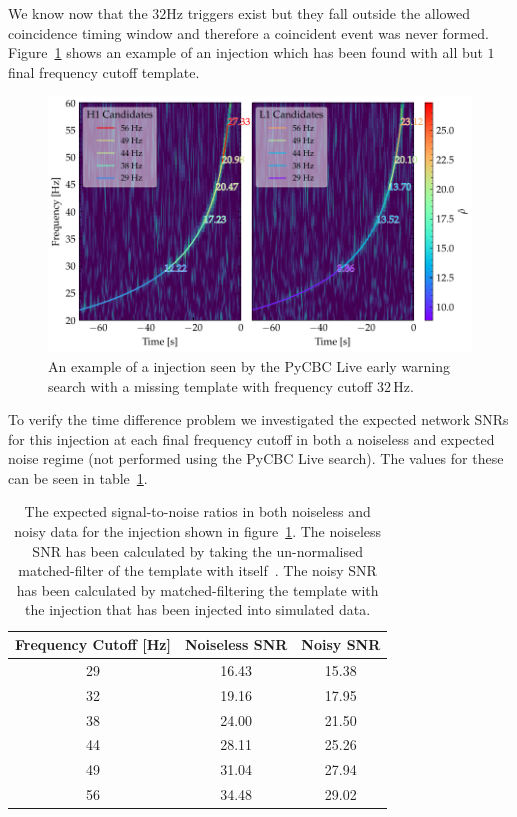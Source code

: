 We know now that the $32$Hz triggers exist but they fall outside the allowed coincidence timing window and therefore a coincident event was never formed. Figure~\ref{6:fig:missing-freq-eg} shows an example of an injection which has been found with all but $1$ final frequency cutoff template. 
%
\begin{figure}
    \centering
    \includegraphics[width=1.0\linewidth]{images/6_earlywarning/stories/missing_freqs_example.pdf}
    \caption{An example of a \gwadj injection seen by the PyCBC Live early warning search with a missing template with frequency cutoff $32 \, \text{Hz}$.}
    \label{6:fig:missing-freq-eg}
\end{figure}
%
To verify the time difference problem we investigated the expected network SNRs for this injection at each final frequency cutoff in both a noiseless and expected noise regime (not performed using the PyCBC Live search). The values for these can be seen in table~\ref{6:tab:noise_snrs}.
%
\begin{table}[ht]
    \centering
    \setlength{\tabcolsep}{4pt}
    \begin{tabular}{ccc}
        \toprule
        \textbf{Frequency Cutoff [Hz]} & \textbf{Noiseless SNR} & \textbf{Noisy SNR} \\
        \midrule
        29 & 16.43 & 15.38 \\
        32 & 19.16 & 17.95 \\
        38 & 24.00 & 21.50 \\
        44 & 28.11 & 25.26 \\
        49 & 31.04 & 27.94 \\
        56 & 34.48 & 29.02 \\
        \bottomrule
    \end{tabular}
    \caption{The expected signal-to-noise ratios in both noiseless and noisy data for the \gwadj injection shown in figure~\ref{6:fig:missing-freq-eg}. The noiseless SNR has been calculated by taking the un-normalised matched-filter of the template with itself~\cite{Brown_Thesis:2004}. The noisy SNR has been calculated by matched-filtering the template with the injection that has been injected into simulated \gwadj data.}
    \label{6:tab:noise_snrs}
\end{table}
